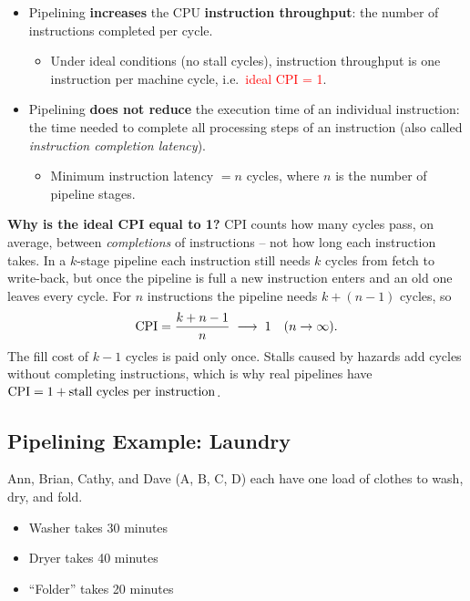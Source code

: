 \begin{itemize}
  \item Pipelining \textbf{increases} the CPU \textbf{instruction throughput}:
  the number of instructions completed per cycle.
  \begin{itemize}
    \item Under ideal conditions (no stall cycles), instruction throughput is
    one instruction per machine cycle, i.e.\ \textcolor{red}{ideal CPI = 1}.
  \end{itemize}
  \item Pipelining \textbf{does not reduce} the execution time of an
  individual instruction: the time needed to complete all processing steps of
  an instruction (also called \emph{instruction completion latency}).
  \begin{itemize}
    \item Minimum instruction latency $= n$ cycles, where $n$ is the number of
    pipeline stages.
  \end{itemize}
\end{itemize}

\begin{explanation}
\textbf{Why is the ideal CPI equal to 1?} CPI counts how many cycles pass, on
average, between \emph{completions} of instructions -- not how long each
instruction takes. In a $k$-stage pipeline each instruction still needs $k$
cycles from fetch to write-back, but once the pipeline is full a new
instruction enters and an old one leaves every cycle. For $n$ instructions the
pipeline needs $k + (n-1)$ cycles, so
\[
  \mathrm{CPI} = \frac{k + n - 1}{n} \;\longrightarrow\; 1 \quad (n\to\infty).
\]
The fill cost of $k-1$ cycles is paid only once. Stalls caused by hazards add
cycles without completing instructions, which is why real pipelines have
$\mathrm{CPI} = 1 + \text{stall cycles per instruction}$.
\end{explanation}

\subsection{Pipelining Example: Laundry}
\label{sec:laundry}

\begin{eg}
Ann, Brian, Cathy, and Dave (A, B, C, D) each have one load of clothes to
wash, dry, and fold.
\begin{itemize}
  \item Washer takes 30 minutes
  \item Dryer takes 40 minutes
  \item ``Folder'' takes 20 minutes
\end{itemize}
\end{eg}

